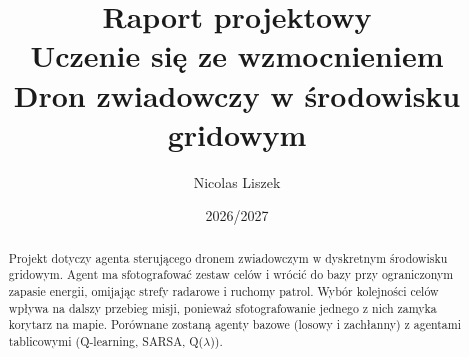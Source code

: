 \documentclass[12pt]{article}
\title{Raport projektowy\\Uczenie się ze wzmocnieniem\\[0.3cm]
  \large Dron zwiadowczy w środowisku gridowym}
\author{Nicolas Liszek}
\date{2026/2027}
\begin{document}
\maketitle

\begin{abstract}
Projekt dotyczy agenta sterującego dronem zwiadowczym w dyskretnym środowisku
gridowym. Agent ma sfotografować zestaw celów i wrócić do bazy przy
ograniczonym zapasie energii, omijając strefy radarowe i ruchomy patrol.
Wybór kolejności celów wpływa na dalszy przebieg misji, ponieważ sfotografowanie
jednego z nich zamyka korytarz na mapie. Porównane zostaną agenty bazowe
(losowy i zachłanny) z agentami tablicowymi (Q-learning, SARSA, Q($\lambda$)).
\end{abstract}

\tableofcontents
\newpage





% 
% 
% 
% 
% 
% 
% 




\end{document}
